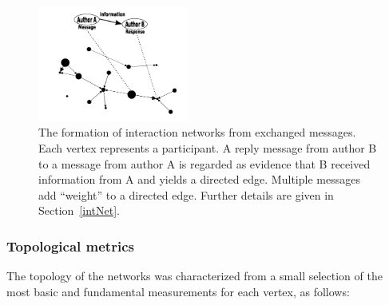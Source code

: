 \documentclass[%
	aip,
	jmp,%
	amsmath,amssymb,
	reprint,%
]{revtex4-1}
\begin{document}
\begin{figure}[!h]
	\centering
	\includegraphics[width=0.44\textwidth]{figs/criaRede2_}
	\caption{The formation of interaction networks from exchanged messages. Each vertex represents a participant. A reply message from author B to a message from author A is regarded as evidence that B received information from A and yields a directed edge. 	Multiple messages add ``weight'' to a directed edge. Further details are given in Section~\ref{intNet}.}
	\label{formationNetwork}
\end{figure}


\subsubsection{Topological metrics}\label{measures}

The topology of the networks was characterized 
from a small selection of the most basic and 
fundamental measurements for each vertex, as follows:
\end{document}
